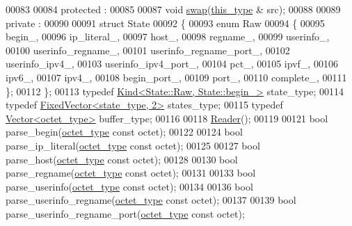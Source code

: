 \begin{DoxyCode}
00083 
00084 \textcolor{keyword}{protected} :
00085 
00087     \textcolor{keywordtype}{void} \hyperlink{classhryky_1_1uri_1_1authority_1_1_reader_ad3d8d4ade26d5fc8c53503c5a402c4c8}{swap}(\hyperlink{classhryky_1_1uri_1_1authority_1_1_reader}{this_type} & src);
00088 
00089 \textcolor{keyword}{private} :
00090 
00091     \textcolor{keyword}{struct }State
00092     \{
00093         \textcolor{keyword}{enum} Raw
00094         \{
00095             begin\_,
00096             ip\_literal\_,
00097             host\_,
00098             regname\_,
00099             userinfo\_,
00100             userinfo\_regname\_,
00101             userinfo\_regname\_port\_,
00102             userinfo\_ipv4\_,
00103             userinfo\_ipv4\_port\_,
00104             pct\_,
00105             ipvf\_,
00106             ipv6\_,
00107             ipv4\_,
00108             begin\_port\_,
00109             port\_,
00110             complete\_,
00111         \};
00112     \};
00113     \textcolor{keyword}{typedef} \hyperlink{classhryky_1_1_kind}{Kind<State::Raw, State::begin_>} state\_type;
00114     \textcolor{keyword}{typedef} \hyperlink{classhryky_1_1_fixed_vector}{FixedVector<state_type, 2>}      states\_type;
00115     \textcolor{keyword}{typedef} \hyperlink{classhryky_1_1_vector}{Vector<octet_type>}              buffer\_type;
00116 
00118     \hyperlink{classhryky_1_1uri_1_1_reader}{Reader}();
00119 
00121     \textcolor{keywordtype}{bool} parse\_begin(\hyperlink{namespacehryky_a488cba8b666be33ccca70e819684e3c8}{octet_type} \textcolor{keyword}{const} octet);
00122 
00124     \textcolor{keywordtype}{bool} parse\_ip\_literal(\hyperlink{namespacehryky_a488cba8b666be33ccca70e819684e3c8}{octet_type} \textcolor{keyword}{const} octet);
00125 
00127     \textcolor{keywordtype}{bool} parse\_host(\hyperlink{namespacehryky_a488cba8b666be33ccca70e819684e3c8}{octet_type} \textcolor{keyword}{const} octet);
00128 
00130     \textcolor{keywordtype}{bool} parse\_regname(\hyperlink{namespacehryky_a488cba8b666be33ccca70e819684e3c8}{octet_type} \textcolor{keyword}{const} octet);
00131 
00133     \textcolor{keywordtype}{bool} parse\_userinfo(\hyperlink{namespacehryky_a488cba8b666be33ccca70e819684e3c8}{octet_type} \textcolor{keyword}{const} octet);
00134 
00136     \textcolor{keywordtype}{bool} parse\_userinfo\_regname(\hyperlink{namespacehryky_a488cba8b666be33ccca70e819684e3c8}{octet_type} \textcolor{keyword}{const} octet);
00137 
00139     \textcolor{keywordtype}{bool} parse\_userinfo\_regname\_port(\hyperlink{namespacehryky_a488cba8b666be33ccca70e819684e3c8}{octet_type} \textcolor{keyword}{const} octet);

\end{DoxyCode}
